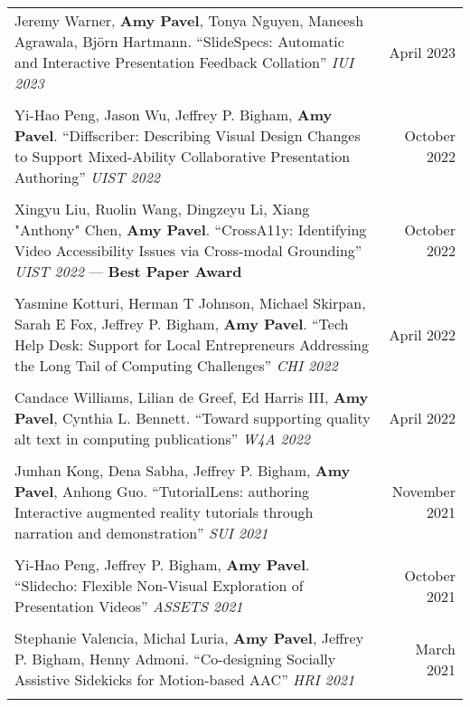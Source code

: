 \begin{longtable}{Xr}
	Jeremy Warner, \textbf{Amy Pavel}, Tonya Nguyen, Maneesh Agrawala, Björn Hartmann. ``SlideSpecs: Automatic and Interactive Presentation Feedback Collation'' \textit{IUI 2023} & April 2023 \\
	\\

	Yi-Hao Peng, Jason Wu, Jeffrey P. Bigham, \textbf{Amy Pavel}. ``Diffscriber: Describing Visual Design Changes to Support Mixed-Ability Collaborative Presentation Authoring'' \textit{UIST 2022} & October 2022 \\
	\\

	Xingyu Liu, Ruolin Wang, Dingzeyu Li, Xiang "Anthony" Chen, \textbf{Amy Pavel}. ``CrossA11y: Identifying Video Accessibility Issues via Cross-modal Grounding'' \textit{UIST 2022} --- \textbf{Best Paper Award} & October 2022 \\
	\\

	Yasmine Kotturi, Herman T Johnson, Michael Skirpan, Sarah E Fox, Jeffrey P. Bigham, \textbf{Amy Pavel}. ``Tech Help Desk: Support for Local Entrepreneurs Addressing the Long Tail of Computing Challenges'' \textit{CHI 2022} & April 2022 \\
	\\

	Candace Williams, Lilian de Greef, Ed Harris III, \textbf{Amy Pavel}, Cynthia L. Bennett. ``Toward supporting quality alt text in computing publications'' \textit{W4A 2022} & April 2022 \\
	\\

	Junhan Kong, Dena Sabha, Jeffrey P. Bigham, \textbf{Amy Pavel}, Anhong Guo. ``TutorialLens: authoring Interactive augmented reality tutorials through narration and demonstration'' \textit{SUI 2021} & November 2021 \\
	\\

	Yi-Hao Peng, Jeffrey P. Bigham, \textbf{Amy Pavel}. ``Slidecho: Flexible Non-Visual Exploration of Presentation Videos'' \textit{ASSETS 2021} & October 2021 \\
	\\

	Stephanie Valencia, Michal Luria, \textbf{Amy Pavel}, Jeffrey P. Bigham, Henny Admoni. ``Co-designing Socially Assistive Sidekicks for Motion-based AAC'' \textit{HRI 2021} & March 2021 \\
	\\


\end{longtable}
